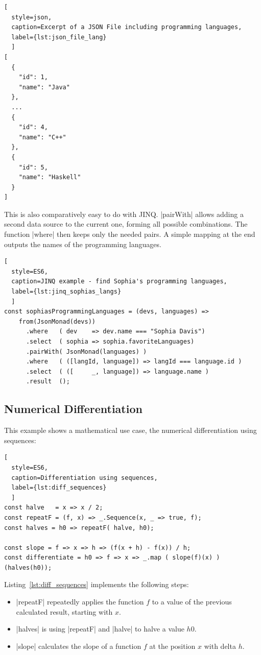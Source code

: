 \begin{lstlisting}[
  style=json, 
  caption=Excerpt of a JSON File including programming languages,
  label={lst:json_file_lang}
  ]
[
  {
    "id": 1,
    "name": "Java"
  },
  ...
  {
    "id": 4,
    "name": "C++"
  },
  {
    "id": 5,
    "name": "Haskell"
  }
]
\end{lstlisting}
This is also comparatively easy to do with JINQ. |pairWith| allows adding a
second data source to the current one, forming all possible combinations. The
function |where| then keeps only the needed pairs. A simple mapping at the end
outputs the names of the programming languages.
\begin{lstlisting}[
  style=ES6, 
  caption=JINQ example - find Sophia's programming languages,
  label={lst:jinq_sophias_langs}
  ]
const sophiasProgrammingLanguages = (devs, languages) =>
    from(JsonMonad(devs))
      .where   ( dev    => dev.name === "Sophia Davis")
      .select  ( sophia => sophia.favoriteLanguages)
      .pairWith( JsonMonad(languages) )
      .where   ( ([langId, language]) => langId === language.id )
      .select  ( ([     _, language]) => language.name )
      .result  ();
\end{lstlisting}

\subsection{Numerical Differentiation}
\label{sub:Numerical Differentiation}
This example shows a mathematical use case, the numerical differentiation using
sequences:

\begin{lstlisting}[
  style=ES6, 
  caption=Differentiation using sequences,
  label={lst:diff_sequences}
  ]
const halve   = x => x / 2;
const repeatF = (f, x) => _.Sequence(x, _ => true, f);
const halves = h0 => repeatF( halve, h0);

const slope = f => x => h => (f(x + h) - f(x)) / h;
const differentiate = h0 => f => x => _.map ( slope(f)(x) ) (halves(h0));
\end{lstlisting}

Listing~\ref{lst:diff_sequences} implements the following steps: 


\begin{itemize}
  \item{|repeatF| repeatedly applies the function $f$ to a value of the
    previous calculated result, starting with $x$.}
  \item{ |halves| is using |repeatF| and |halve| to halve a value $h0$.} 
    \item{|slope| calculates the slope of a function $f$ at the position $x$
      with delta $h$.}
 \end{itemize}

